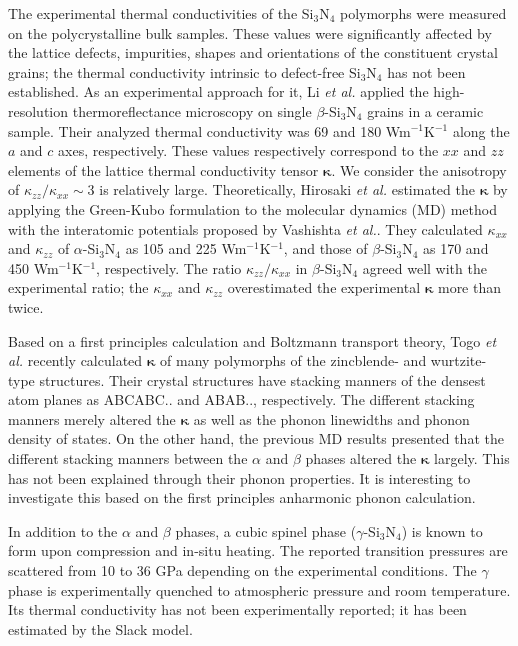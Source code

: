 \documentclass[twocolumn,amsmath,amssymb,a4paper,prb,superscriptaddress,floatfix]{revtex4-1}
\begin{document}
The experimental thermal conductivities
\cite{zhou,hirao-rev,watari,hirosaki,hirai} of the Si$_3$N$_4$ polymorphs were
measured on the polycrystalline bulk samples. These values were significantly
affected by the lattice defects, impurities, shapes and orientations of the
constituent crystal grains;\cite{hirosaki-md} the thermal conductivity
intrinsic to defect-free Si$_3$N$_4$ has not been established. As an
experimental approach for it, Li {\it et al.}\cite{li} applied the
high-resolution thermoreflectance microscopy on single $\beta$-Si$_3$N$_4$
grains in a ceramic sample. Their analyzed thermal conductivity was 69 and 180
Wm$^{-1}$K$^{-1}$ along the $a$ and $c$ axes, respectively.  These values
respectively correspond to the $xx$ and $zz$ elements of the lattice thermal
conductivity tensor $\boldsymbol{\kappa}$. We consider the anisotropy of
$\kappa_{zz}/\kappa_{xx}\sim 3$ is relatively large.  Theoretically, Hirosaki
{\it et al.}\cite{hirosaki-md} estimated the $\boldsymbol{\kappa}$ by applying
the Green-Kubo formulation to the molecular dynamics (MD) method with the
interatomic potentials proposed by Vashishta {\it et al.}\cite{vashishta}.
They calculated $\kappa$$_{xx}$ and $\kappa$$_{zz}$ of $\alpha$-Si$_3$N$_4$ as
105 and 225 Wm$^{-1}$K$^{-1}$, and those of $\beta$-Si$_3$N$_4$ as 170 and 450
Wm$^{-1}$K$^{-1}$, respectively.  The ratio $\kappa_{zz}/\kappa_{xx}$ in
$\beta$-Si$_3$N$_4$ agreed well with the experimental ratio; the $\kappa_{xx}$
and $\kappa_{zz}$ overestimated the experimental $\boldsymbol{\kappa}$ more than
twice. 

Based on a first principles calculation and Boltzmann transport
theory\cite{phono3py}, Togo {\it{et al.}} recently calculated
$\boldsymbol{\kappa}$ of many polymorphs of the zincblende- and wurtzite-type
structures. Their crystal structures have stacking manners of the densest atom
planes as ABCABC.. and ABAB.., respectively. The different stacking manners
merely altered the $\boldsymbol{\kappa}$ as well as the phonon linewidths and
phonon density of states.\cite{phono3py} 
On the other hand, the previous MD results presented that the different stacking
manners between the $\alpha$ and $\beta$ phases altered the $\boldsymbol{\kappa}$
largely. This has not been explained through their phonon properties.  It is
interesting to investigate this based on the first principles anharmonic phonon
calculation.

In addition to the $\alpha$ and $\beta$ phases, a cubic spinel phase
($\gamma$-Si$_3$N$_4$) is known to form upon compression and in-situ
heating.\cite{zerr,zhang} The reported transition pressures are scattered from
10 to 36 GPa depending on the experimental conditions.\cite{xu}  The $\gamma$
phase is experimentally quenched to atmospheric pressure and room temperature.
Its thermal conductivity has not been experimentally reported; it has been
estimated by the Slack model.\cite{morelli} 
\end{document}
